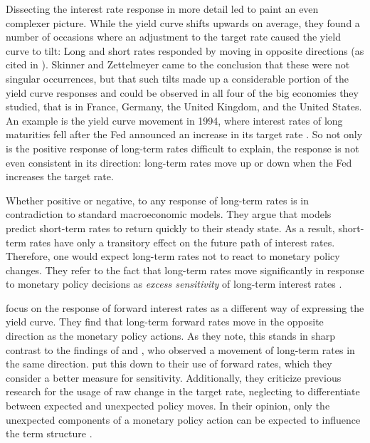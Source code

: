 \documentclass[11pt,a4paper,english,oneside]{book}
\numberwithin{equation}{chapter}
\begin{document}
Dissecting the interest rate response in more detail led \cite{Skinner.1995} to paint an even complexer picture. While the yield curve shifts upwards on average, they found a number of occasions where an adjustment to the target rate caused the yield curve to tilt: Long and short rates responded by moving in opposite directions (as cited in \citealp[p. 1]{Ellingsen.2003}). Skinner and Zettelmeyer came to the conclusion that these were not singular occurrences, but that such tilts made up a considerable portion of the yield curve responses and could be observed in all four of the big economies they studied, that is in France, Germany, the United Kingdom, and the United States. An example is the yield curve movement in 1994, where interest rates of long maturities fell after the Fed announced an increase in its target rate \citep[~p. 1594]{Ellingsen.2001}. So not only is the positive response of long-term rates difficult to explain, the response is not even consistent in its direction: long-term rates move up or down when the Fed increases the target rate. 

Whether positive or negative, to \citet[p. 425]{Gurkaynak.2005} any response of long-term rates is in contradiction to standard macroeconomic models. They argue that models predict short-term rates to return quickly to their steady state. As a result, short-term rates have only a transitory effect on the future path of interest rates. Therefore, one would expect long-term rates not to react to monetary policy changes. They refer to the fact that long-term rates move significantly in response to monetary policy decisions as \textit{excess sensitivity} of long-term interest rates \cite[p. 2]{Gurkaynak.2003}.

\citet[pp. 426--427]{Gurkaynak.2005} focus on the response of forward interest rates as a different way of expressing the yield curve. They find that long-term forward rates move in the opposite direction as the monetary policy actions. As they note, this stands in sharp contrast to the findings of \cite{Cook.1989} and \cite{Romer.2000}, who observed a movement of long-term rates in the same direction. \citeauthor{Gurkaynak.2005} put this down to their use of forward rates, which they consider a better measure for sensitivity. %
Additionally, they criticize previous research for the usage of raw change in the target rate, neglecting to differentiate between expected and unexpected policy moves. In their opinion, only the unexpected components of a monetary policy action can be expected to influence the term structure \citep[pp. 430--431]{Gurkaynak.2005}.
\end{document}
